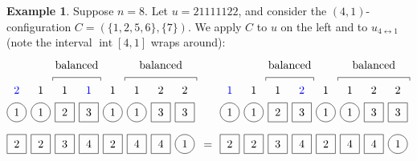 \documentclass[reqno]{amsart}
\newcommand{\0}{\phantom{c}}
\DeclareMathOperator{\inter}{int} %
\theoremstyle{plain}
\theoremstyle{definition}
\newtheorem{example}[thm]{Example}
\numberwithin{equation}{section}
\begin{document}
\begin{example}
Suppose $n = 8$.
Let $u = 21111122$, and consider the $(4,1)$-configuration $C = (\{1,2,5,6\},\{7\})$.
We apply $C$ to $u$ on the left and to $u_{4\leftrightarrow1}$ (note the interval $\inter[4,1]$ wraps around):
\[
\begin{tikzpicture}[baseline=25]
  \def\sc{0.75}   %
  \def\lll{2.7}   %
  \def\ll{2}   %
  \def\l{1}   %
  \node[color=blue] at (1*\sc,\lll) {$2$};
  \node[color=blue] at (4*\sc,\lll) {$1$};
  \foreach \i in {2,3,5,6} { \node at (\i*\sc,\lll){$1$}; }
  \foreach \i in {7,8} { \node at (\i*\sc,\lll){$2$}; }
  \foreach \i in {1,2,5,6} { \draw (\i*\sc,\ll) circle (0.3); }
  \foreach \i in {3,4,7,8} { \draw (\i*\sc-.3,\ll-.3) rectangle +(0.6,+0.6); }
  \foreach \i in {1,2,5,6} { \node at (\i*\sc,\ll) {$1$}; }
  \foreach \i in {3} { \node at (\i*\sc,\ll) {$2$}; }
  \foreach \i in {4,7,8} { \node at (\i*\sc,\ll) {$3$}; }
  \foreach \i in {8} { \draw (\i*\sc,\l) circle (0.3); }
  \foreach \i in {1,2,3,4,5,6,7} { \draw (\i*\sc-.3,\l-.3) rectangle +(0.6,+0.6); }
  \foreach \i in {4,6,7} { \node at (\i*\sc,\l) {$4$}; }
  \foreach \i in {8} { \node at (\i*\sc,\l) {$1$}; }
  \foreach \i in {3} { \node at (\i*\sc,\l) {$3$}; }
  \foreach \i in {1,2,5} { \node at (\i*\sc,\l) {$2$}; }
  \draw (2.5*\sc,3) -- (2.5*\sc,3.1) -- (4.5*\sc,3.1) -- (4.5*\sc,3);
  \node at (3.5*\sc,3.5) {balanced};
  \draw (5.5*\sc,3) -- (5.5*\sc,3.1) -- (8.5*\sc,3.1) -- (8.5*\sc,3);
  \node at (7.0*\sc,3.5) {balanced};
\end{tikzpicture}
\hspace{3pt} = \hspace{4pt}
\begin{tikzpicture}[baseline=25]
  \def\sc{0.75}   %
  \def\lll{2.7}   %
  \def\ll{2}   %
  \def\l{1}   %
  \node[color=blue] at (4*\sc,\lll) {$2$};
  \node[color=blue] at (1*\sc,\lll) {$1$};
  \foreach \i in {2,3,5,6} { \node at (\i*\sc,\lll){$1$}; }
  \foreach \i in {7,8} { \node at (\i*\sc,\lll){$2$}; }
  \foreach \i in {1,2,5,6} { \draw (\i*\sc,\ll) circle (0.3); }
  \foreach \i in {3,4,7,8} { \draw (\i*\sc-.3,\ll-.3) rectangle +(0.6,+0.6); }
  \foreach \i in {1,2,5,6} { \node at (\i*\sc,\ll) {$1$}; }
  \foreach \i in {3} { \node at (\i*\sc,\ll) {$2$}; }
  \foreach \i in {4,7,8} { \node at (\i*\sc,\ll) {$3$}; }
  \foreach \i in {8} { \draw (\i*\sc,\l) circle (0.3); }
  \foreach \i in {1,2,3,4,5,6,7} { \draw (\i*\sc-.3,\l-.3) rectangle +(0.6,+0.6); }
  \foreach \i in {4,6,7} { \node at (\i*\sc,\l) {$4$}; }
  \foreach \i in {8} { \node at (\i*\sc,\l) {$1$}; }
  \foreach \i in {3} { \node at (\i*\sc,\l) {$3$}; }
  \foreach \i in {1,2,5} { \node at (\i*\sc,\l) {$2$}; }
  \draw (2.5*\sc,3) -- (2.5*\sc,3.1) -- (4.5*\sc,3.1) -- (4.5*\sc,3);
  \node at (3.5*\sc,3.5) {balanced};
  \draw (5.5*\sc,3) -- (5.5*\sc,3.1) -- (8.5*\sc,3.1) -- (8.5*\sc,3);
  \node at (7.0*\sc,3.5) {balanced};
\end{tikzpicture}
\]
\end{example}
\end{document}
